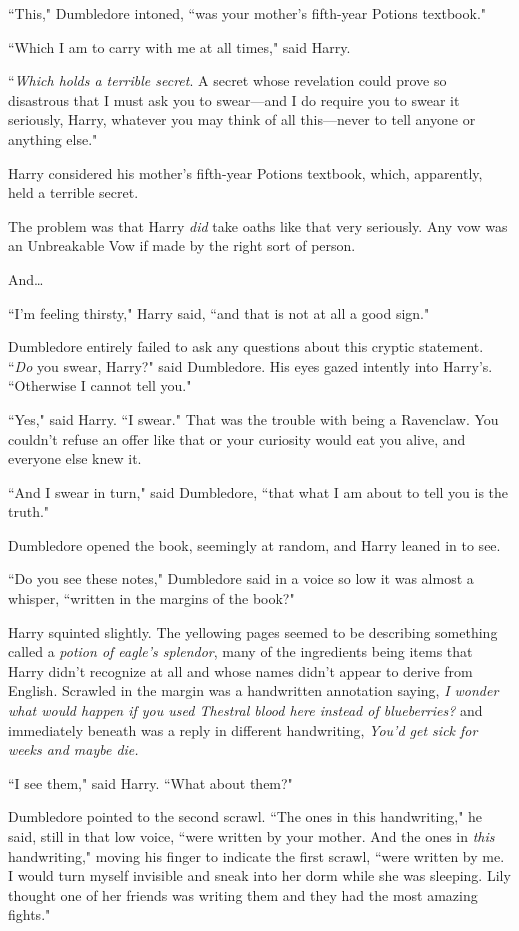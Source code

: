 ``This," Dumbledore intoned, ``was your mother's fifth-year Potions textbook."

``Which I am to carry with me at all times," said Harry.

``\emph{Which holds a terrible secret}. A secret whose revelation could prove so disastrous that I must ask you to swear—and I do require you to swear it seriously, Harry, whatever you may think of all this—never to tell anyone or anything else."

Harry considered his mother's fifth-year Potions textbook, which, apparently, held a terrible secret.

The problem was that Harry \emph{did} take oaths like that very seriously. Any vow was an Unbreakable Vow if made by the right sort of person.

And{\ldots}

``I'm feeling thirsty," Harry said, ``and that is not at all a good sign."

Dumbledore entirely failed to ask any questions about this cryptic statement. ``\emph{Do} you swear, Harry?" said Dumbledore. His eyes gazed intently into Harry's. ``Otherwise I cannot tell you."

``Yes," said Harry. ``I swear." That was the trouble with being a Ravenclaw. You couldn't refuse an offer like that or your curiosity would eat you alive, and everyone else knew it.

``And I swear in turn," said Dumbledore, ``that what I am about to tell you is the truth."

Dumbledore opened the book, seemingly at random, and Harry leaned in to see.

``Do you see these notes," Dumbledore said in a voice so low it was almost a whisper, ``written in the margins of the book?"

Harry squinted slightly. The yellowing pages seemed to be describing something called a \emph{potion of eagle's splendor}, many of the ingredients being items that Harry didn't recognize at all and whose names didn't appear to derive from English. Scrawled in the margin was a handwritten annotation saying, \emph{I wonder what would happen if you used Thestral blood here instead of blueberries?} and immediately beneath was a reply in different handwriting, \emph{You'd get sick for weeks and maybe die.}

``I see them," said Harry. ``What about them?"

Dumbledore pointed to the second scrawl. ``The ones in this handwriting," he said, still in that low voice, ``were written by your mother. And the ones in \emph{this} handwriting," moving his finger to indicate the first scrawl, ``were written by me. I would turn myself invisible and sneak into her dorm while she was sleeping. Lily thought one of her friends was writing them and they had the most amazing fights."

